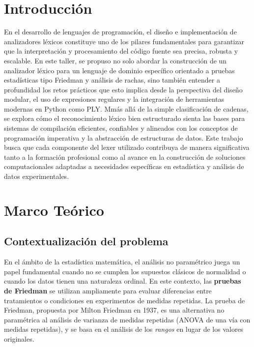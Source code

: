 \documentclass{article}
\begin{document}

\section{Introducción}\label{sec:intr}

En el desarrollo de lenguajes de programación, el diseño e implementación de 
analizadores léxicos constituye uno de los pilares fundamentales para garantizar 
que la interpretación y procesamiento del código fuente sea precisa, robusta 
y escalable. En este taller, se propuso no solo abordar la construcción de un 
analizador léxico para un lenguaje de dominio específico orientado a pruebas 
estadísticas tipo Friedman y análisis de rachas, sino también entender a profundidad 
los retos prácticos que esto implica desde la perspectiva del diseño modular, 
el uso de expresiones regulares y la integración de herramientas modernas en 
Python como PLY. Mmás allá de la simple clasificación de 
cadenas, se explora cómo el reconocimiento léxico bien estructurado sienta las 
bases para sistemas de compilación eficientes, confiables y alineados con 
los conceptos de programación imperativa y la abstracción de estructuras de 
datos. Este trabajo busca que cada componente del lexer utilizado contribuya 
de manera significativa tanto a la formación profesional como al 
avance en la construcción de soluciones computacionales adaptadas a 
necesidades específicas en estadística y análisis de datos experimentales.


\section{Marco Teórico}\label{sec:marc}


\subsection{Contextualización del problema}

En el ámbito de la estadística matemática, el análisis no paramétrico juega un papel fundamental cuando no se cumplen los supuestos clásicos de normalidad o cuando los datos tienen una naturaleza ordinal. En este contexto, las \textbf{pruebas de Friedman} se utilizan ampliamente para evaluar diferencias entre tratamientos o condiciones en experimentos de medidas repetidas. La prueba de Friedman, propuesta por Milton Friedman en 1937, es una alternativa no paramétrica al análisis de varianza de medidas repetidas (ANOVA de una vía con medidas repetidas), y se basa en el análisis de los \emph{rangos} en lugar de los valores originales.
\end{document}
